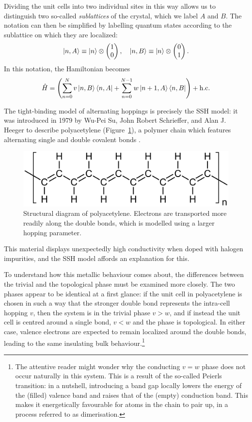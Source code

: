 Dividing the unit cells into two individual sites in this way allows us to distinguish two so-called \emph{sublattices} of the crystal, which we label $A$ and $B$. The notation can then be simplified by labelling quantum states according to the sublattice on which they are localized:
\[
	\ket{n,A} \equiv \ket{n}\otimes\begin{pmatrix}
		1 \\ 0
	\end{pmatrix},\quad \ket{n,B} \equiv \ket{n}\otimes\begin{pmatrix}
		0 \\ 1
	\end{pmatrix}.
\]
In this notation, the Hamiltonian becomes
\begin{equation}\label{eq:ssh-sublattice}
	\hat{H} = \left(\sum_{n=0}^{N}v\ket{n,B}\bra{n,A} + \sum_{n=0}^{N-1}w\ket{n+1,A}\bra{n,B}\right) + {\rm h.c.}
\end{equation}

The tight-binding model of alternating hoppings is precisely the SSH model: it was introduced in 1979 by Wu-Pei Su, John Robert Schrieffer, and Alan J. Heeger to describe polyacetylene (Figure~\ref{fig:polyacetylene}), a polymer chain which features alternating single and double covalent bonds \cites{SSH_model}{SSH_model2}.
\begin{figure}[htb!]
	\centering
	\includegraphics[width=.8\linewidth]{Images/polyacetylene} %
	\caption{Structural diagram of polyacetylene. Electrons are transported more readily along the double bonds, which is modelled using a larger hopping parameter.}
	\label{fig:polyacetylene}
\end{figure}
This material displays unexpectedly high conductivity when doped with halogen impurities, and the SSH model affords an explanation for this.

To understand how this metallic behaviour comes about, the differences between the trivial and the topological phase must be examined more closely. The two phases appear to be identical at a first glance: if the unit cell in polyacetylene is chosen in such a way that the stronger double bond represents the intra-cell hopping $v$, then the system is in the trivial phase $v>w$, and if instead the unit cell is centred around a single bond, $v<w$ and the phase is topological. In either case, valence electrons are expected to remain localized around the double bonds, leading to the same insulating bulk behaviour.\footnote{
	The attentive reader might wonder why the conducting $v=w$ phase does not occur naturally in this system. This is a result of the so-called Peierls transition: in a nutshell, introducing a band gap locally lowers the energy of the (filled) valence band and raises that of the (empty) conduction band. This makes it energetically favourable for atoms in the chain to pair up, in a process referred to as dimerisation.}

